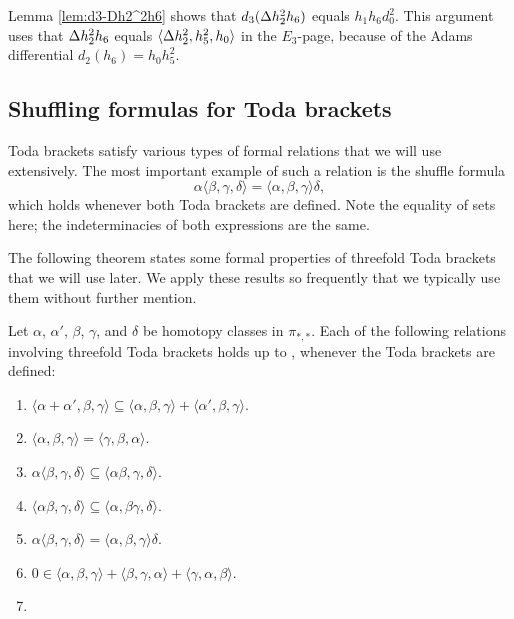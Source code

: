 \begin{ex}
Lemma \ref{lem:d3-Dh2^2h6} shows that 
$d_3(\Delta h_2^2 h_6)$ equals $h_1 h_6 d_0^2$. 
This argument uses that 
$\Delta h_2^2 h_6$ equals $\langle \Delta h_2^2, h_5^2, h_0 \rangle$
in the $E_3$-page, because of the Adams differential 
$d_2(h_6) = h_0 h_5^2$.
\end{ex}

\subsection{Shuffling formulas for Toda brackets}

Toda brackets satisfy various types of formal relations that we 
will use extensively.  The most important example of such a relation
is the shuffle formula
\[
\alpha \langle \beta, \gamma, \delta \rangle =
\langle \alpha, \beta, \gamma \rangle \delta,
\]
which holds whenever both Toda brackets are defined.
Note the equality of sets here; the indeterminacies of both
expressions are the same.

The following theorem states some formal properties of threefold
Toda brackets that we will use later.  
We apply these results so frequently that
we typically use them without further mention.

\begin{thm}
\label{thm:Toda-3fold}
Let $\alpha$, $\alpha'$, $\beta$, $\gamma$, and $\delta$ 
be homotopy classes in $\pi_{*,*}$. 
Each of the following relations involving threefold Toda brackets
holds up to , whenever the Toda brackets are defined:
\begin{enumerate}
\item 
$ \langle \alpha + \alpha', \beta, \gamma\rangle \subseteq 
\langle \alpha, \beta, \gamma \rangle + 
\langle \alpha', \beta, \gamma\rangle.$
\item 
$ \langle \alpha, \beta, \gamma\rangle = 
\langle \gamma, \beta, \alpha \rangle.$
\item
 $\alpha \langle \beta, \gamma, \delta \rangle \subseteq 
 \langle \alpha\beta, \gamma, \delta \rangle.$
\item 
$\langle \alpha  \beta, \gamma, \delta \rangle \subseteq 
\langle \alpha, \beta\gamma, \delta \rangle.$
\item $\alpha \langle \beta, \gamma, \delta \rangle = \langle \alpha, \beta, \gamma \rangle \delta.$
\item $0 \in \langle \alpha, \beta, \gamma\rangle + 
\langle \beta, \gamma, \alpha\rangle + 
\langle \gamma, \alpha, \beta\rangle.$
\item 
\label{part:0}
\end{enumerate}
\end{thm}

